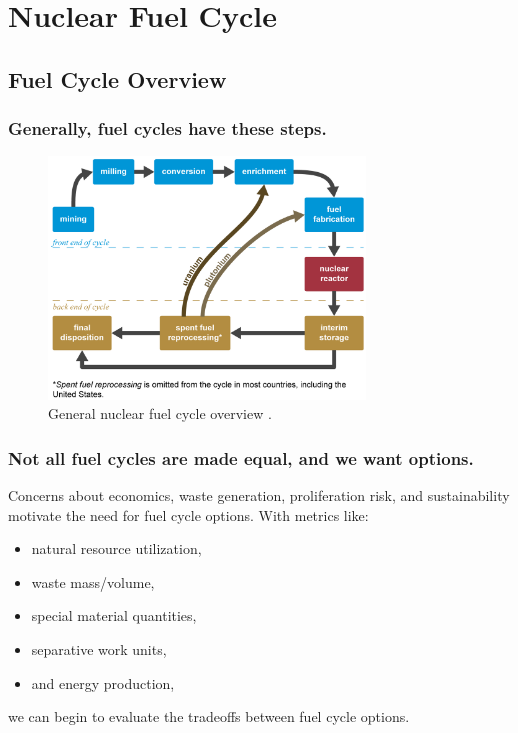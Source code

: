\documentclass[9pt]{beamer}
\begin{document}
\section{Nuclear Fuel Cycle}
\subsection{Fuel Cycle Overview}
  \begin{frame}
      \frametitle{Generally, fuel cycles have these steps.}
      \begin{figure}[ht!]
      \centering
      \includegraphics[width=0.75\textwidth]{images/nuclear_fuel_cycle.png}
      \caption{General nuclear fuel cycle overview \cite{penn_fc}.}
      \end{figure}
  \end{frame}

  \begin{frame}
      \frametitle{Not all fuel cycles are made equal, and we want options.}
      Concerns about economics, waste generation, proliferation risk, and sustainability motivate the need for fuel cycle options. With metrics like:
        \begin{itemize}%
            \item natural resource utilization, %
            \item waste mass/volume,
            \item special material quantities,
            \item separative work units,
            \item and energy production,
        \end{itemize}
        we can begin to evaluate the tradeoffs between fuel cycle options.
  \end{frame}
\end{document}
